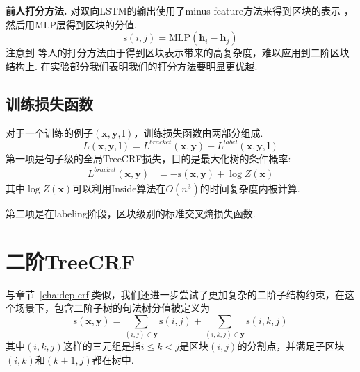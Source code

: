 \noindent\textbf{前人打分方法.}
\citep{stern-etal-2017-minimal}对双向LSTM的输出使用了minus feature方法来得到区块的表示 \citep{wang-chang-2016-graph,cross-huang-2016-span}，然后用MLP层得到区块的分值.
\begin{equation} \label{eq:minus-score}
  \mathrm{s}(i,j)=\mathrm{MLP}(\mathbf{h}_{i}-\mathbf{h}_{j})
\end{equation}
注意到 \citep{stern-etal-2017-minimal}等人的打分方法由于得到区块表示带来的高复杂度，难以应用到二阶区块结构上.
在实验部分我们表明我们的打分方法要明显更优越.

\subsection{训练损失函数}

对于一个训练的例子$(\boldsymbol{x},\boldsymbol{y},\boldsymbol{l})$，训练损失函数由两部分组成.
\begin{equation} \label{eq:final-loss}
  \mathit{L}(\boldsymbol{x}, \boldsymbol{y}, \boldsymbol{l}) = \mathit{L}^{bracket}(\boldsymbol{x}, \boldsymbol{y}) + \mathit{L}^{label}(\boldsymbol{x}, \boldsymbol{y}, \boldsymbol{l})
\end{equation}
第一项是句子级的全局TreeCRF损失，目的是最大化树的条件概率:
\begin{equation}\label{eq:bracket-loss}
  \begin{split}
    \mathit{L}^{bracket}(\boldsymbol{x},\boldsymbol{y})
    &= -\mathrm{s}(\boldsymbol{x}, \boldsymbol{y}) + \log Z(\boldsymbol{x})
  \end{split}
\end{equation}
其中$\log Z(\boldsymbol{x})$可以利用Inside算法在$O(n^3)$的时间复杂度内被计算.

第二项是在labeling阶段，区块级别的标准交叉熵损失函数.

\section{二阶TreeCRF}
\label{sec:con-2o-treecrf}

与章节~\ref{cha:dep-crf}类似，我们还进一步尝试了更加复杂的二阶子结构约束，在这个场景下，包含二阶子树的句法树分值被定义为
\begin{equation} \label{eq:2ostree-score}
  \mathrm{s}(\boldsymbol{x},\boldsymbol{y}) = \sum\limits_{(i,j)\in \boldsymbol{y}}\mathrm{s}(i,j)+\sum\limits_{(i,k,j)\in \boldsymbol{y}}\mathrm{s}(i,k,j)
\end{equation}
其中$(i,k,j)$这样的三元组是指$i \leq k < j$是区块$(i,j)$的分割点，并满足子区块$(i,k)$和$(k+1,j)$都在树中.

